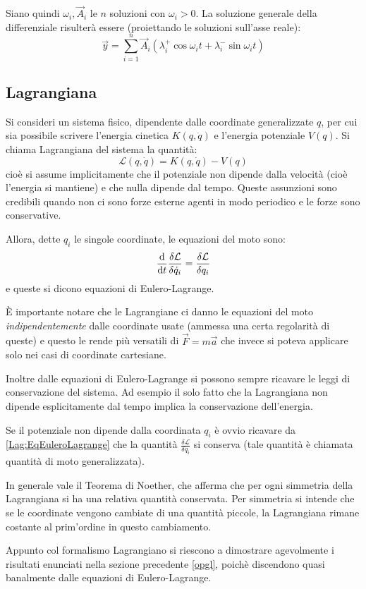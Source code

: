 \documentclass[../main.tex]{subfiles}
\begin{document}
Siano quindi $\omega_i, \vec A_i$ le $n$ soluzioni con $\omega_i>0$.
La soluzione generale della differenziale risulterà essere (proiettando le soluzioni sull'asse reale):
\begin{equation}\label{opgl:Soluzioni}
	\vec y = \sum_{i=1}^n \vec A_i\left( \lambda^+_i\cos\omega_i t + \lambda^-_i\sin \omega_i t \right)
\end{equation}

\subsection{Lagrangiana}\label{lag}
Si consideri un sistema fisico, dipendente dalle coordinate generalizzate $q$, per cui sia possibile scrivere l'energia cinetica $K(q,\dot q)$ e l'energia potenziale $V(q)$.
Si chiama Lagrangiana del sistema la quantità:
\begin{equation}\label{lag:Definizione}
	\mathcal L(q,\dot q)=K(q,\dot q)-V(q)
\end{equation}
cioè si assume implicitamente che il potenziale non dipende dalla velocità (cioè l'energia si mantiene) e che nulla dipende dal tempo. Queste assunzioni sono credibili quando non ci sono forze esterne agenti in modo periodico e le forze sono conservative.

Allora, dette $q_i$ le singole coordinate, le equazioni del moto sono:
\begin{equation}\label{Lag:EqEuleroLagrange}
	\frac{\mathrm{d}}{\mathrm{d} t} \frac{\delta \mathcal L}{\delta \dot q_i} = \frac{\delta \mathcal L}{\delta q_i}
\end{equation}
e queste si dicono equazioni di Eulero-Lagrange.

È importante notare che le Lagrangiane ci danno le equazioni del moto \emph{indipendentemente} dalle coordinate usate (ammessa una certa regolarità di queste) e questo le rende più versatili di $\vec F=m\vec a$ che invece si poteva applicare solo nei casi di coordinate cartesiane.

Inoltre dalle equazioni di Eulero-Lagrange si possono sempre ricavare le leggi di conservazione del sistema. Ad esempio il solo fatto che la Lagrangiana non dipende esplicitamente dal tempo implica la conservazione dell'energia.

Se il potenziale non dipende dalla coordinata $q_i$ è ovvio ricavare da \cref{Lag:EqEuleroLagrange} che la quantità $\frac{\delta \mathcal L}{\delta \dot q_i}$ si conserva (tale quantità è chiamata quantità di moto generalizzata).

In generale vale il Teorema di Noether, che afferma che per ogni simmetria della Lagrangiana si ha una relativa quantità conservata. Per simmetria si intende che se le coordinate vengono cambiate di una quantità piccole, la Lagrangiana rimane costante al prim'ordine in questo cambiamento.

Appunto col formalismo Lagrangiano si riescono a dimostrare agevolmente i risultati enunciati nella sezione precedente \cref{opgl}, poichè discendono quasi banalmente dalle equazioni di Eulero-Lagrange.
\end{document}
